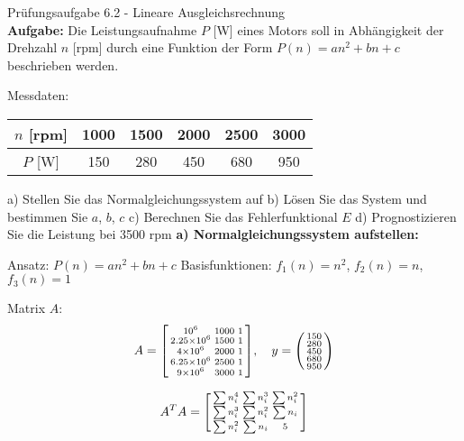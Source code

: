\begin{example2}{Prüfungsaufgabe 6.2 - Lineare Ausgleichsrechnung}\\
\textbf{Aufgabe:} Die Leistungsaufnahme $P$ [W] eines Motors soll in Abhängigkeit der Drehzahl $n$ [rpm] durch eine Funktion der Form $P(n) = an^2 + bn + c$ beschrieben werden.

Messdaten:
\begin{center}
\begin{tabular}{|c|c|c|c|c|c|}
\hline
$n$ [rpm] & 1000 & 1500 & 2000 & 2500 & 3000 \\
\hline
$P$ [W] & 150 & 280 & 450 & 680 & 950 \\
\hline
\end{tabular}
\end{center}

a) Stellen Sie das Normalgleichungssystem auf
b) Lösen Sie das System und bestimmen Sie $a$, $b$, $c$
c) Berechnen Sie das Fehlerfunktional $E$
d) Prognostizieren Sie die Leistung bei 3500 rpm
\tcblower
\textbf{a) Normalgleichungssystem aufstellen:}

Ansatz: $P(n) = an^2 + bn + c$
Basisfunktionen: $f_1(n) = n^2$, $f_2(n) = n$, $f_3(n) = 1$

Matrix $A$:
$$A = \begin{bsmallmatrix}
10^6 & 1000 & 1 \\
2.25 \times 10^6 & 1500 & 1 \\
4 \times 10^6 & 2000 & 1 \\
6.25 \times 10^6 & 2500 & 1 \\
9 \times 10^6 & 3000 & 1
\end{bsmallmatrix}, \quad y = \begin{psmallmatrix} 150 \\ 280 \\ 450 \\ 680 \\ 950 \end{psmallmatrix}$$

$$A^T A = \begin{bsmallmatrix}
\sum n_i^4 & \sum n_i^3 & \sum n_i^2 \\
\sum n_i^3 & \sum n_i^2 & \sum n_i \\
\sum n_i^2 & \sum n_i & 5
\end{bsmallmatrix}$$


\end{example2}
